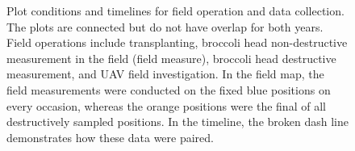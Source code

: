 \begin{figure}[htb]
  \begin{center}
  \end{center}
  \caption[Plot conditions and timelines for field operation and data collection]{
    Plot conditions and timelines for field operation and data collection. The plots are connected but do not have overlap for both years. Field operations include transplanting, broccoli head non-destructive measurement in the field (field measure), broccoli head destructive measurement, and UAV field investigation. In the field map, the field measurements were conducted on the fixed blue positions on every occasion, whereas the orange positions were the final of all destructively sampled positions. In the timeline, the broken dash line demonstrates how these data were paired.
  }
  \label{fig:bro5}
\end{figure}